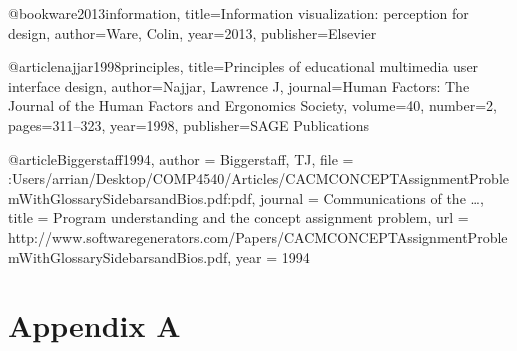 \documentclass{article}
\begin{document}
@book{ware2013information,
  title={Information visualization: perception for design},
  author={Ware, Colin},
  year={2013},
  publisher={Elsevier}
}

@article{najjar1998principles,
  title={Principles of educational multimedia user interface design},
  author={Najjar, Lawrence J},
  journal={Human Factors: The Journal of the Human Factors and Ergonomics Society},
  volume={40},
  number={2},
  pages={311--323},
  year={1998},
  publisher={SAGE Publications}
}

@article{Biggerstaff1994,
author = {Biggerstaff, TJ},
file = {:Users/arrian/Desktop/COMP4540/Articles/CACMCONCEPTAssignmentProblemWithGlossarySidebarsandBios.pdf:pdf},
journal = {Communications of the \ldots},
title = {{Program understanding and the concept assignment problem}},
url = {http://www.softwaregenerators.com/Papers/CACMCONCEPTAssignmentProblemWithGlossarySidebarsandBios.pdf},
year = {1994}
}


\section{Appendix A}
\end{document}
